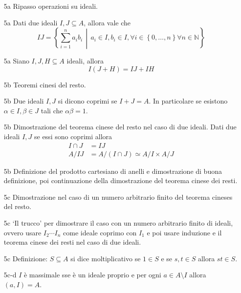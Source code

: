 \documentclass[italian]{article}
\begin{document}
    \begin{enumerate}
        \item[5a] Ripasso operazioni su ideali.
        \item[5a] Dati due ideali $I,J \subseteq A$, allora vale che 
            \begin{equation*}
              IJ = \left\{ \sum^n_{i=1} a_i b_i \,\middle|\, a_i \in I, b_i \in
              I, \forall i \in \left\{0, \dots, n \right\} \forall n \in \mathbb{N}\right\}
            \end{equation*}
        \item[5a] Siano $I,J,H \subseteq A$ ideali, allora 
              \begin{equation*}
                  I(J+H)= IJ + IH
              \end{equation*}
        \item[5b] Teoremi cinesi del resto. 
        \item[5b] Due ideali $I,J$ si dicono coprimi se $I+J = A$. In
          particolare se esistono $\alpha \in I, \beta \in J$ tali che $\alpha
          \beta = 1$.
        \item[5b] Dimostrazione del teorema cinese del resto nel caso di due
          ideali. Dati due ideali $I,J$ se essi sono coprimi allora 
            \begin{align*}
              I \cap J & = IJ \\
              A / IJ & = A / (I \cap J) \simeq A/I \times A/J 
            \end{align*}
        \item[5b] Definizione del prodotto cartesiano di anelli
          e dimostrazione di buona definizione, poi continuazione della
          dimostrazione del teorema cinese dei resti.
        \item[5c] Dimostrazione nel caso di un numero arbitrario finito del
          teorema cineses del resto.
        \item[5c] `Il trucco' per dimostrare il caso con un numero arbitrario
          finito di ideali, ovvero usare $I_2 \cdots I_n$ come ideale coprimo
          con $I_1$ e poi usare induzione e il teorema cinese dei resti nel caso
          di due ideali.
        \item[5c] Definizione: $S \subseteq A$ si dice 
          moltiplicativo se $1 \in S$ e se $s, t \in S$ allora $st \in S$.
        \item[5c-d] $I$ è massimale sse è un ideale proprio e per ogni $a \in
          A \setminus I$ allora $(a, I) = A$.
    \end{enumerate}
\end{document}

